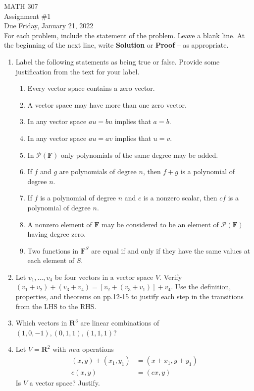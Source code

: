 \documentclass[12pt]{article}
\begin{document}
\noindent MATH 307 \\
Assignment \#1 \\
Due Friday, January 21, 2022 \\

For each problem, include the statement of the problem. Leave a blank line.  At the beginning of the next line, write \textbf{Solution} or \textbf{Proof} -- as appropriate.

\begin{enumerate}
\item Label the following statements as being true or false.
Provide some justification from the text for your label.
    \begin{enumerate}
        \item Every vector space contains a zero vector.
        \item A vector space may have more than one zero vector.
        \item In any vector space $au=bu$ implies that $a=b$.
        \item In any vector space $au=av$ implies that $u=v$.
        \item In $\mathcal{P}(\mathbf{F})$ only polynomials of the same degree may be added.
        \item If $f$ and $g$ are polynomials of degree $n$, then $f+g$ is a polynomial of degree $n$.
        \item If $f$ is a polynomial of degree $n$ and $c$ is a nonzero scalar, then $cf$ is a polynomial of degree $n$.
        \item A nonzero element of $\mathbf{F}$ may be considered to be an element of $\mathcal{P}(\mathbf{F})$ having degree zero.
        \item Two functions in $\mathbf{F}^S$ are equal if and only if they have the same values at each element of $S$.
    \end{enumerate}

\item Let $v_1, \ldots, v_4$ be four vectors in a vector space $V$. Verify $(v_1 + v_2) +( v_3+v_4) = [v_2+(v_3+v_1)]+v_4$.  Use the definition, properties, and theorems on pp.12-15 to justify each step in the transitions from the LHS to the RHS.

\item Which vectors in $\mathbf{R}^3$ are linear combinations of $(1,0,-1), (0,1,1), (1,1,1)$?

\item Let $V = \mathbf{R}^2$ with \emph{new} operations
\begin{align*}
    (x,y)+(x_1,y_1) &= (x+x_1,y+y_1) \\
    c(x,y) &=(cx,y)
\end{align*}
Is $V$ a vector space?  Justify.


\end{enumerate}
\end{document}

